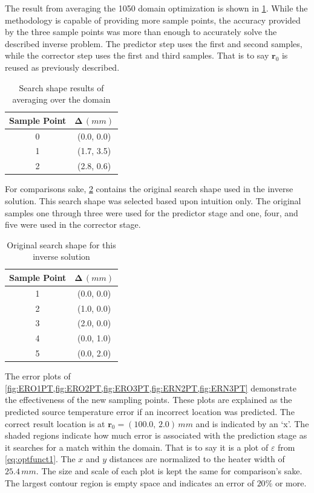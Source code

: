\documentclass[preprint,12pt]{elsarticle}
\newcommand{\bv}[1]{\boldsymbol #1}  %
\begin{document}
The result from averaging the 1050 domain optimization is shown in \cref{tab:optresults}.  While the methodology is capable of providing more sample points, the accuracy provided by the three sample points was more than enough to accurately solve the described inverse problem.  The predictor step uses the first and second samples, while the corrector step uses the first and third samples.  That is to say $\bv{r_0}$ is reused as previously described.
\begin{table}[!h!t!b!p]
\begin{center}
\begin{tabular}{ c c }
\hline
 Sample Point & $\bv{\Delta} \, (mm)$  \\ \hline 
0 & (0.0, 0.0) \\
1 & (1.7, 3.5) \\
2 & (2.8, 0.6) \\  \hline
 \end{tabular}
\caption{Search shape results of averaging over the domain}
\label{tab:optresults}
\end{center}
\end{table}

For comparisons sake, \cref{tab:original} contains the original search shape used in the inverse solution.  This search shape was selected based upon intuition only.  The original samples one through three were used for the predictor stage and one, four, and five were used in the corrector stage.
%
\begin{table}[!h!t!b!p]
\begin{center}
\begin{tabular}{ c c }
\hline
 Sample Point & $\bv{\Delta} \, (mm)$  \\ \hline 
1 & (0.0, 0.0) \\
2 & (1.0, 0.0) \\
3 & (2.0, 0.0) \\
4 & (0.0, 1.0) \\
5 & (0.0, 2.0) \\ \hline
 \end{tabular}
\caption{Original search shape for this inverse solution}
\label{tab:original}
\end{center}
\end{table}

The error plots of \cref{fig:ERO1PT,fig:ERO2PT,fig:ERO3PT,fig:ERN2PT,fig:ERN3PT} demonstrate the effectiveness of the new sampling points.  These plots are explained as the predicted source temperature error if an incorrect location was predicted.  The correct result location is at $\bv{r_0} = (100.0,\,2.0)\,mm$ and is indicated by an `x'.  The shaded regions indicate how much error is associated with the prediction stage as it searches for a match within the domain.  That is to say it is a plot of $\varepsilon$ from \cref{eq:optfunct1}.  The $x$ and $y$ distances are normalized to the heater width of $25.4\,mm$.  The size and scale of each plot is kept the same for comparison's sake.  The largest contour region is empty space and indicates an error of $20\%$ or more.
\end{document}
